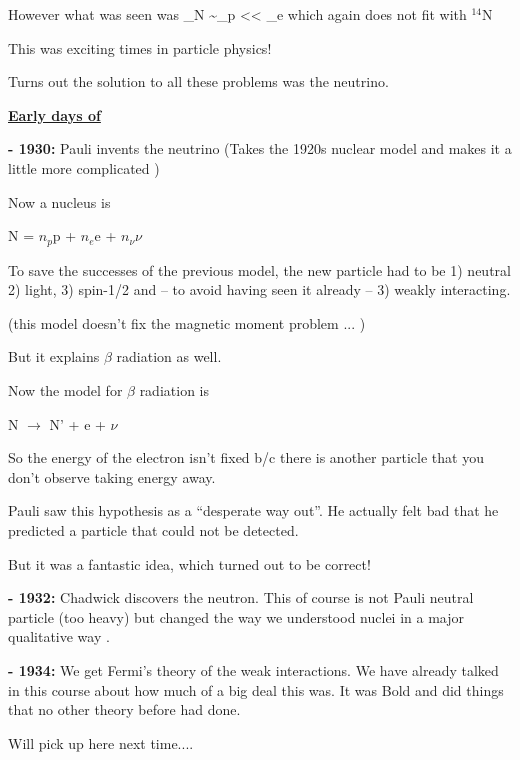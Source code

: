 {However what was seen was 
\be
\mu_N \sim \mu_p << \mu_e \hspace{0.2in} \textrm{which again does not fit with $^{14}$N}
\ee

This was exciting times in particle physics! 

Turns out the solution to all these problems was the neutrino.

\textbf{\underline{Early days of \nus}}

\textbf{- 1930:} Pauli invents the neutrino (Takes the 1920s nuclear model and makes it a little more complicated )

Now a nucleus is

\begin{center}
N = $n_p$p + $n_e$e + $n_\nu \nu$
\end{center}

To save the successes of the previous model, the new particle had to be 1) neutral 2) light, 3) spin-1/2 and -- to avoid having seen it already -- 3) weakly interacting. 

(this model doesn't fix the magnetic moment problem ... )

But it explains $\beta$ radiation as well.

Now the model for $\beta$ radiation is

\begin{center}
N $\rightarrow$ N' + e + $\nu$
\end{center}

So the energy of the electron isn't fixed b/c there is another particle that you don't observe taking energy away.

Pauli saw this hypothesis as a ``desperate way out''.
He actually felt bad that he predicted a particle that could not be detected. 

But it was a fantastic idea, which turned out to be correct! 


\textbf{- 1932:} Chadwick  discovers the neutron. This of course is not Pauli neutral particle (too heavy) but changed the way we understood nuclei in a major qualitative way . 

\textbf{- 1934:} We get Fermi's theory of the weak interactions.  We have already talked in this course about how much of a big deal this was. 
It was Bold and did things that no other theory before had done. 

Will pick up here next time....


}



